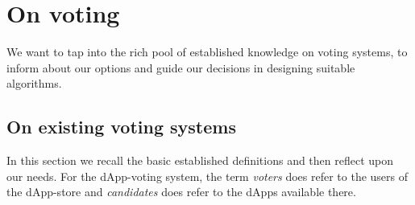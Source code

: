 
\section{On voting}
We want to tap into the rich pool of established knowledge on  voting systems, to inform about our options and guide our decisions in designing suitable algorithms. 

\subsection{On existing voting systems}
In this section we recall the basic established definitions and then reflect upon our needs. For the dApp-voting system, the term \textit{voters} does refer to the users of the dApp-store and \textit{candidates} does refer to the dApps available there. \\ 

